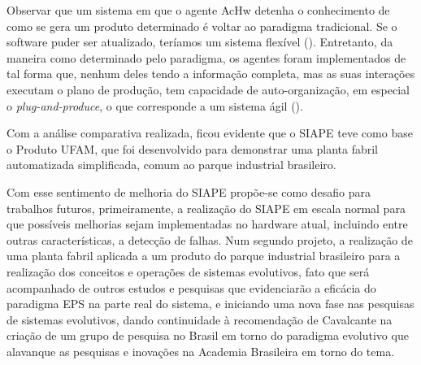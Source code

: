 	Observar que um sistema em que o agente AcHw detenha o conhecimento de como se gera um produto determinado é voltar ao paradigma tradicional. Se o software puder ser atualizado, teríamos um sistema flexível (\iTresZero). Entretanto, da maneira como determinado pelo paradigma, os agentes foram implementados de tal forma que, nenhum deles tendo a informação completa, mas as suas interações executam o plano de produção, tem capacidade de auto-organização, em especial o \textit{plug-and-produce}, o que corresponde a um sistema ágil (\iQuatroZero).
	   
		
	Com a análise comparativa realizada, ficou evidente que o SIAPE teve como base o Produto UFAM, que foi desenvolvido para demonstrar uma planta fabril automatizada simplificada, comum ao parque industrial brasileiro. %
	
	Com esse sentimento de melhoria do SIAPE propõe-se como desafio para trabalhos futuros, primeiramente, a realização do SIAPE em escala normal para que possíveis melhorias sejam implementadas no hardware atual, incluindo entre outras características, a detecção de falhas. Num segundo projeto, a realização de uma planta fabril aplicada a um produto do parque industrial brasileiro para a realização dos conceitos e operações de sistemas evolutivos, fato que será acompanhado de outros estudos e pesquisas que evidenciarão a eficácia do paradigma EPS na parte real do sistema, e iniciando uma nova fase nas pesquisas de sistemas evolutivos, dando continuidade à recomendação de Cavalcante na criação de um grupo de pesquisa no Brasil em torno do paradigma evolutivo que alavanque as pesquisas e inovações na Academia Brasileira em torno do tema.
	

